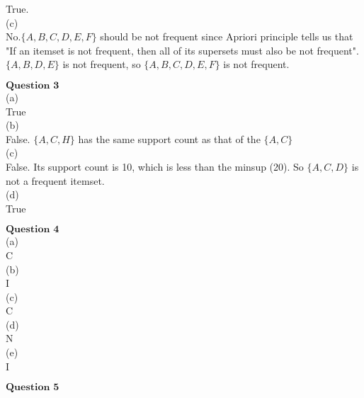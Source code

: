 \documentclass[12pt]{article}
\begin{document}
True.\\

(c)\\

No.$\{A,B,C,D,E,F\}$ should be not frequent since Apriori principle tells us that "If an itemset is not frequent, then all of its supersets must also be not frequent".$\{A,B,D,E\}$ is not frequent, so $\{A,B,C,D,E,F\}$ is not frequent.\\

\newpage

$\textbf{Question 3}$\\

(a) \\

True\\

(b)\\

False. $\{A,C,H\}$ has the same support count as that of the $\{A,C\}$\\

(c)\\

False. Its support count is 10, which is less than the minsup
(20). So $\{A,C,D\}$ is not a frequent itemset.\\

(d)\\

True\\

\newpage

$\textbf{Question 4}$\\

(a)\\

C\\

(b)\\

I\\

(c)\\

C\\

(d)\\

N\\

(e)\\

I\\

\newpage

$\textbf{Question 5}$\\
\end{document}
